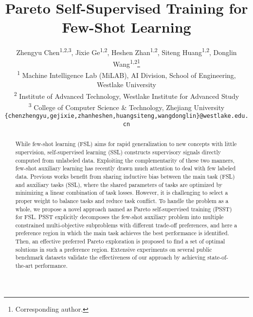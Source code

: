 \documentclass[final]{cvpr}
\begin{document}
\title{Pareto Self-Supervised Training for Few-Shot Learning}

\author{Zhengyu Chen\textsuperscript{\rm 1,2,3},
	Jixie Ge\textsuperscript{\rm 1,2}, Heshen Zhan\textsuperscript{\rm 1,2}, Siteng Huang\textsuperscript{\rm 1,2},
	Donglin Wang\textsuperscript{\rm 1,2}\thanks{{Corresponding author.} } \\
	\textsuperscript{\rm 1}  Machine Intelligence Lab (MiLAB), AI Division, School of Engineering, Westlake University \\
\textsuperscript{\rm 2} Institute of Advanced Technology, Westlake Institute for Advanced Study   \\
\textsuperscript{\rm 3} College of Computer Science \& Technology, Zhejiang University \\
{\tt\small \{chenzhengyu,gejixie,zhanheshen,huangsiteng,wangdonglin\}@westlake.edu.cn}
}
 

\maketitle
 
\begin{abstract}
While few-shot learning (FSL) aims for rapid generalization to new concepts with little supervision, self-supervised learning (SSL) constructs supervisory signals directly computed from unlabeled data. Exploiting the complementarity of these two manners, few-shot auxiliary learning has recently drawn much attention to deal with few labeled data. Previous works benefit from sharing inductive bias between the main task (FSL) and auxiliary tasks (SSL), where the shared parameters of tasks are optimized by minimizing a linear combination of task losses. However, it is challenging to select a proper weight to balance tasks and reduce task conflict. To handle the problem as a whole, we propose a novel approach named as Pareto self-supervised training (PSST) for FSL. PSST explicitly decomposes the few-shot auxiliary problem into multiple constrained multi-objective subproblems with different trade-off preferences, 
and here a preference region in which the main task achieves the best performance is identified. Then, an effective preferred Pareto exploration is proposed to find a set of optimal solutions in such a preference region. Extensive experiments on several public benchmark datasets validate the effectiveness of our approach by achieving state-of-the-art performance.

\end{abstract}
 
\end{document}

